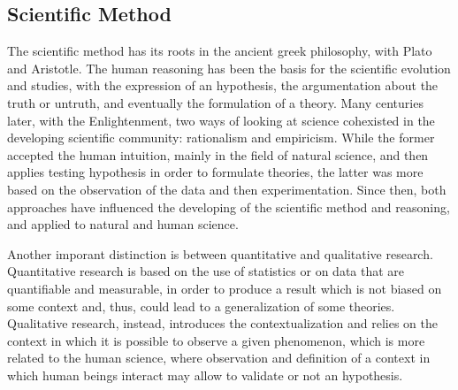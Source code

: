 \documentclass[12pt]{article}
\begin{document}
\subsection{Scientific Method}
\label{sub:sciMeth}

The scientific method has its roots in the ancient greek philosophy, with Plato and Aristotle. The human reasoning has been the basis for the scientific evolution and studies, with the expression of an hypothesis, the argumentation about the truth or untruth, and eventually the formulation of a theory. Many centuries later, with the Enlightenment, two ways of looking at science cohexisted in the developing scientific community: rationalism and empiricism. While the former accepted the human intuition, mainly in the field of natural science, and then applies testing hypothesis in order to formulate theories, the latter was more based on the observation of the data and then experimentation. Since then, both approaches have influenced the developing of the scientific method and reasoning, and applied to natural and human science.\cite{carroll}

Another imporant distinction is between quantitative and qualitative research. Quantitative research is based on the use of statistics or on data that are quantifiable and measurable, in order to produce a result which is not biased on some context and, thus, could lead to a generalization of some theories. Qualitative research, instead, introduces the contextualization and relies on the context in which it is possible to observe a given phenomenon, which is more related to the human science, where observation and definition of a context in which human beings interact may allow to validate or not an hypothesis.\cite{kaplan}
\end{document}

